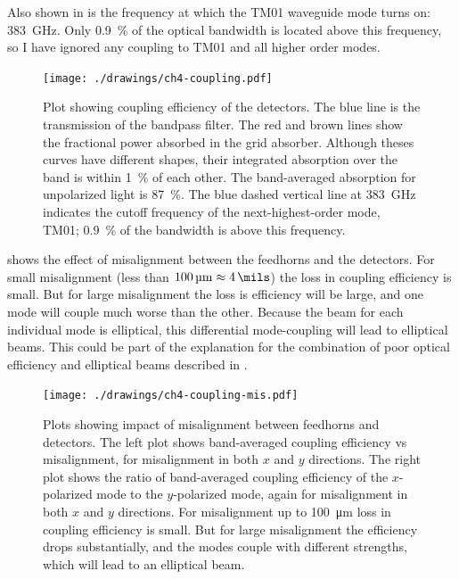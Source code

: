 Also shown in  is the frequency at which the TM01 waveguide mode turns on: \SI{383}{\GHz}.
Only \SI{0.9}{\percent} of the optical bandwidth is located above this frequency, so I have ignored any coupling to TM01 and all higher order modes.

\begin{figure}
\centering
\texttt{[image: ./drawings/ch4-coupling.pdf]}
\caption[Detector coupling efficiency]{
  Plot showing coupling efficiency of the detectors.
  The blue line is the transmission of the bandpass filter.
  The red and brown lines show the fractional power absorbed in the grid absorber.
  Although theses curves have different shapes, their integrated absorption over the band is within \SI{1}{\percent} of each other.
  The band-averaged absorption for unpolarized light is \SI{87}{\percent}.
  The blue dashed vertical line at \SI{383}{\GHz} indicates the cutoff frequency of the next-highest-order mode, TM01; \SI{0.9}{\percent} of the bandwidth is above this frequency.
}
\label{fig:ch4-coupling}
\end{figure}

 shows the effect of misalignment between the feedhorns and the detectors.
For small misalignment (less than $\SI{100}{\um} \approx \SI{4}{\mils}$) the loss in coupling efficiency is small.
But for large misalignment the loss is efficiency will be large, and one mode will couple much worse than the other.
Because the beam for each individual mode is elliptical, this differential mode-coupling will lead to elliptical beams.
This could be part of the explanation for the combination of poor optical efficiency and elliptical beams described in .

\begin{figure}
\centering
\texttt{[image: ./drawings/ch4-coupling-mis.pdf]}
\caption[Feedhorn / detector misalignment]{
  Plots showing impact of misalignment between feedhorns and detectors.
  The left plot shows band-averaged coupling efficiency vs misalignment, for misalignment in both $x$ and $y$ directions.
  The right plot shows the ratio of band-averaged coupling efficiency of the $x$-polarized mode to the $y$-polarized mode, again for misalignment in both $x$ and $y$ directions.
  For misalignment up to \SI{100}{\um} loss in coupling efficiency is small.
  But for large misalignment the efficiency drops substantially, and the modes couple with different strengths, which will lead to an elliptical beam.
}
\label{fig:ch4-coupling-mis}
\end{figure}


